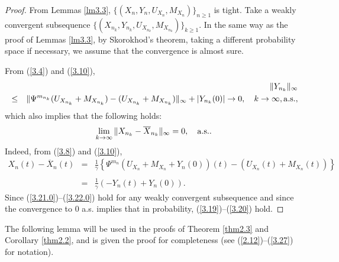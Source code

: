 \documentclass[12pt]{article}
\begin{document}
\begin{proof}
From Lemmas \ref{lm3.3}, $\{(X_{n},Y_{n}, U_{X_{n}},M_{X_{n}})\}_{n\ge 1}$ is tight.
Take a weakly convergent subsequence
$\{(X_{n_k},Y_{n_k}, U_{X_{n_k}},M_{X_{n_k}})\}_{k\ge 1}$.
In the same way as the proof of Lemmas \ref{lm3.3},
by Skorokhod's theorem, taking a different probability space if necessary, we assume that the convergence is almost sure. 

From (\ref{3.4}) and (\ref{3.10}), 
\begin{eqnarray}\label{3.21.0}
&&\|Y_{n_k}\|_\infty\\
&\le&  \|\Psi^{m_{n_k}}(U_{X_{n_k}}+M_{X_{n_k}})-(U_{X_{n_k}}+M_{X_{n_k}})\|_\infty+|Y_{n_k}(0)|\to 0,\quad k\to\infty, {\rm a.s.},\nonumber
\end{eqnarray}
which also implies that the following holds:
\begin{equation}\label{3.22.0}
\lim_{k\to\infty}\|X_{n_k}-\overline X_{n_k}\|_\infty=0, \quad {\rm a.s.}.
\end{equation}
Indeed,  from (\ref{3.8}) and (\ref{3.10}),
\begin{eqnarray}\label{3.25.0}
X_{n}(t)-\overline X_{n}(t)
&=&\frac{1}{\gamma}\left\{\Psi^{m_{n}}(U_{X_{n}}+M_{X_{n}}+Y_{n}(0))(t)-(U_{X_{n}}(t)+M_{X_{n}}(t))\right\}\nonumber\\
\\
&=&\frac{1}{\gamma} (-Y_{n}(t)+Y_{n}(0)).\nonumber
\end{eqnarray}
Since (\ref{3.21.0})--(\ref{3.22.0}) hold for any weakly convergent subsequence and
since the convergence to $0$ a.s. implies that in probability, (\ref{3.19})--(\ref{3.20}) hold.
\end{proof}


The following lemma will be used in the proofs of Theorem \ref{thm2.3}
 and Corollary \ref{thm2.2}, and is given the proof for completeness
 (see (\ref{2.12})--(\ref{3.27}) for notation).
\end{document}
